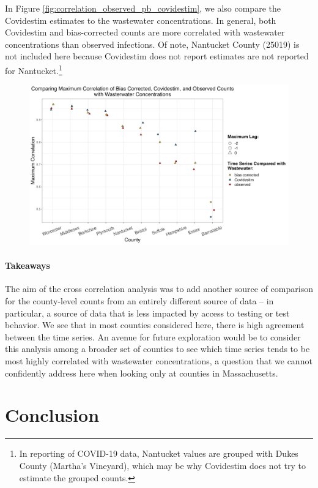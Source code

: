 \documentclass[12pt,twoside]{smiththesis}
\begin{document}
In Figure \ref{fig:correlation_observed_pb_covidestim}, we also compare the Covidestim estimates to the wastewater concentrations. In general, both Covidestim and bias-corrected counts are more correlated with wastewater concentrations than observed infections. Of note, Nantucket County (25019) is not included here because Covidestim does not report estimates are not reported for Nantucket.\footnote{In reporting of COVID-19 data, Nantucket values are grouped with Dukes County (Martha's Vineyard), which may be why Covidestim does not try to estimate the grouped counts.}
\begin{figure}
\includegraphics[width=1\linewidth]{figure/correlation_observed_pb_covidestim} \caption{\label{fig:correlation_observed_pb_covidestim}}\label{fig:unnamed-chunk-90}
\end{figure}
\hypertarget{takeaways}{%
\subsubsection{Takeaways}\label{takeaways}}

The aim of the cross correlation analysis was to add another source of comparison for the county-level counts from an entirely different source of data -- in particular, a source of data that is less impacted by access to testing or test behavior. We see that in most counties considered here, there is high agreement between the time series. An avenue for future exploration would be to consider this analysis among a broader set of counties to see which time series tends to be most highly correlated with wastewater concentrations, a question that we cannot confidently address here when looking only at counties in Massachusetts.

\hypertarget{conclusion}{%
\chapter{Conclusion}\label{conclusion}}
\end{document}
